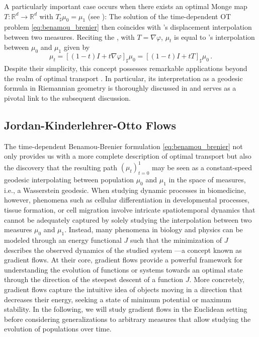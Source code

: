 A particularly important case occurs when there exists an optimal Monge map $T: \mathbb{R}^d \rightarrow \mathbb{R}^d$ with $T_\sharp \mu_0 = \mu_1$ (see ): The solution of the time-dependent OT problem \eqref{eq:benamou_brenier} then coincides with \citeauthor{mccann1997convexity}'s displacement interpolation between two measures.
Reciting the , with $T = \nabla \varphi$, $\mu_t$ is equal to \citeauthor{mccann1997convexity}'s interpolation between $\mu_0$ and $\mu_1$ given by
\begin{equation} \label{eq:mccann_interpolation}
	\mu_t = [(1-t) I+t \nabla \varphi]_\sharp \mu_0 = [(1-t) I+t T]_\sharp \mu_0\,.
\end{equation}
Despite their simplicity, this concept possesses remarkable applications beyond the realm of optimal transport \citep{bonneel2011displacement}. In particular, its interpretation as a geodesic formula in Riemannian geometry is thoroughly discussed in \citet{gangbo1996geometry} and serves as a pivotal link to the subsequent discussion.


\subsection{Jordan-Kinderlehrer-Otto Flows} \label{sec:background_jko}

The time-dependent Benamou-Brenier formulation \eqref{eq:benamou_brenier} not only provides us with a more complete description of optimal transport but also the discovery that the resulting path $(\mu_t)_{t=0}^1$ may be seen as a constant-speed geodesic interpolating between population $\mu_0$ and $\mu_1$ in the space of measures, i.e., a Wasserstein geodesic.
When studying dynamic processes in biomedicine, however, phenomena such as cellular differentiation in developmental processes, tissue formation, or cell migration involve intricate spatiotemporal dynamics that cannot be adequately captured by solely studying the interpolation between two measures $\mu_0$ and $\mu_1$.
Instead, many phenomena in biology and physics can be modeled through an energy functional $J$ such that the minimization of $J$ describes the observed dynamics of the studied system ---a concept known as gradient flows.
At their core, gradient flows provide a powerful framework for understanding the evolution of functions or systems towards an optimal state through the direction of the steepest descent of a function $J$. 
More concretely, gradient flows capture the intuitive idea of objects moving in a direction that decreases their energy, seeking a state of minimum potential or maximum stability. 
In the following, we will study gradient flows in the Euclidean setting before considering generalizations to arbitrary measures that allow studying the evolution of populations over time.

